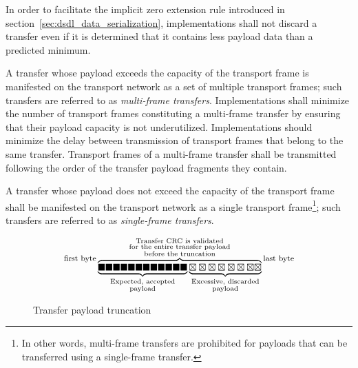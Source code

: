 In order to facilitate the implicit zero extension rule introduced in section~\ref{sec:dsdl_data_serialization},
implementations shall not discard a transfer even if it is determined that it contains less payload
data than a predicted minimum.

A transfer whose payload exceeds the capacity of the transport frame is manifested on the transport network
as a set of multiple transport frames; such transfers are referred to as \emph{multi-frame transfers}.
Implementations shall minimize the number of transport frames constituting a multi-frame transfer by ensuring that
their payload capacity is not underutilized.
Implementations should minimize the delay between transmission of transport frames that belong to the same transfer.
Transport frames of a multi-frame transfer shall be transmitted following the order of the
transfer payload fragments they contain.

A transfer whose payload does not exceed the capacity of the transport frame shall be manifested on the transport
network as a single transport frame\footnote{%
    In other words, multi-frame transfers are prohibited for payloads that can be transferred
    using a single-frame transfer.
}; such transfers are referred to as \emph{single-frame transfers}.

\begin{figure}[H]
    $$
    \raisebox{1em}{\footnotesize{\text{first byte}}}
    \overbrace{%
        \underbrace{%
            \blacksquare\blacksquare\blacksquare\blacksquare\blacksquare\blacksquare%
            \blacksquare\blacksquare\blacksquare\blacksquare\blacksquare\blacksquare%
        }_{\substack{\text{Expected, accepted} \\ \text{payload}}}%
        \underbrace{%
            \boxtimes\boxtimes\boxtimes\boxtimes\boxtimes\boxtimes\boxtimes\boxtimes%
        }_{\substack{\text{Excessive, discarded} \\ \text{payload}}}%
    }^{\substack{%
        \text{Transfer CRC is validated} \\
        \text{for the entire transfer payload} \\
        \text{before the truncation}}
    }
    \raisebox{1em}{\footnotesize{\text{last byte}}}
    $$
    \caption{Transfer payload truncation\label{fig:transport_payload_truncation}}
\end{figure}

